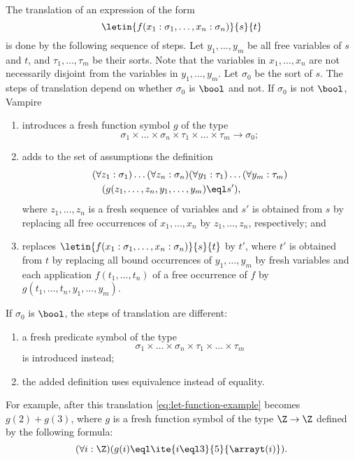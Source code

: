 The translation of an expression of the form $$\letin{f(x_1:\sigma_1,\ldots,x_n:\sigma_n)}{s}{t}$$ is done by the following sequence of steps. Let $y_1,\ldots,y_m$ be all free variables of $s$ and $t$, and $\tau_1,\ldots,\tau_m$ be their sorts. Note that the variables in $x_1,\ldots,x_n$ are not necessarily disjoint from the variables in $y_1,\ldots,y_m$. Let $\sigma_0$ be the sort of $s$. The steps of translation depend on whether $\sigma_0$ is $\bool$ and not. If $\sigma_0$ is not $\bool$, Vampire
\begin{enumerate}
  \item introduces a fresh function symbol $g$ of the type $$\sigma_1 \times \ldots \times \sigma_n \times \tau_1 \times \ldots \times \tau_m \to \sigma_0;$$
  \item adds to the set of assumptions the definition
  \begin{align*}
    &(\forall z_1:\sigma_1)\ldots(\forall z_n:\sigma_n) (\forall y_1:\tau_1)\ldots(\forall y_m:\tau_m)\\
    &\quad(g(z_1,\ldots,z_n,y_1,\ldots,y_m) \eql s'),
  \end{align*} where $z_1,\ldots,z_n$ is a fresh sequence of variables and $s'$ is  obtained from $s$ by replacing all free occurrences of $x_1,\ldots,x_n$ by $z_1,\ldots,z_n$, respectively; and
  \item replaces $\letin{f(x_1:\sigma_1,\ldots,x_n:\sigma_n)}{s}{t}$ by $t'$, where $t'$ is obtained from $t$ by replacing all bound occurrences of $y_1,\ldots,y_m$ by fresh variables and each application $f(t_1, \ldots, t_n)$ of a free occurrence of $f$ by $g(t_1, \ldots, t_n,\allowbreak y_1, \ldots, y_m)$.
\end{enumerate}

If $\sigma_0$ is $\bool$, the steps of translation are different:
\begin{enumerate}
  \item a fresh predicate symbol of the type \[\sigma_1 \times \ldots \times \sigma_n \times \tau_1 \times \ldots \times \tau_m\] is introduced instead;
  \item the added definition uses equivalence instead of equality.
\end{enumerate}

For example, after this translation \eqref{eq:let-function-example} becomes $g(2) + g(3)$, where $g$ is a fresh function symbol of the type $\Z \to \Z$ defined by the following formula: $$(\forall i:\Z)(g(i) \eql \ite{i \eql 3}{5}{\arrayt(i)}).$$

